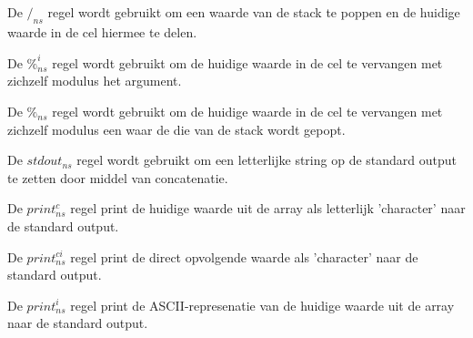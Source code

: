 \documentclass[11pt]{article}
\begin{document}
De $/_{ns}$ regel wordt gebruikt om een waarde van de stack te poppen en de huidige waarde in de cel hiermee te delen.
\begin{prooftree}
\end{prooftree}

De $\%^i_{ns}$ regel wordt gebruikt om de huidige waarde in de cel te vervangen met zichzelf modulus het argument.
\begin{prooftree}
\end{prooftree}

De $\%_{ns}$ regel wordt gebruikt om de huidige waarde in de cel te vervangen met zichzelf modulus een waar de die van de stack wordt gepopt.
\begin{prooftree}
\end{prooftree}



De $stdout_{ns}$ regel wordt gebruikt om een letterlijke string op de standard output te zetten door middel van concatenatie.
\begin{prooftree}
\end{prooftree}


De $print^c_{ns}$ regel print de huidige waarde uit de array als letterlijk 'character' naar de standard output.
\begin{prooftree}
\end{prooftree}

De $print^{ci}_{ns}$ regel print de direct opvolgende waarde als 'character' naar de standard output.
\begin{prooftree}
\end{prooftree}

De $print^i_{ns}$ regel print de ASCII-represenatie van de huidige waarde uit de array naar de standard output.
\begin{prooftree}
\end{prooftree}
\end{document}
